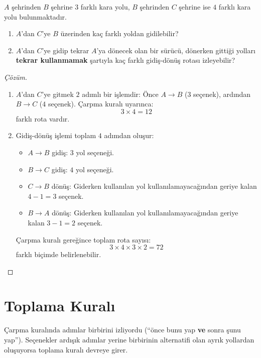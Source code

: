 \begin{example}
$A$ şehrinden $B$ şehrine $3$ farklı kara yolu, $B$ şehrinden $C$ şehrine ise $4$ farklı kara yolu bulunmaktadır.
\begin{enumerate}
  \item $A$'dan $C$'ye $B$ üzerinden kaç farklı yoldan gidilebilir?
  \item $A$'dan $C$'ye gidip tekrar $A$'ya dönecek olan bir sürücü, dönerken gittiği yolları \textbf{tekrar kullanmamak} şartıyla kaç farklı gidiş-dönüş rotası izleyebilir?
\end{enumerate}
\end{example}
\begin{proof}[Çözüm]
\begin{enumerate}
  \item $A$'dan $C$'ye gitmek $2$ adımlı bir işlemdir: Önce $A \to B$ ($3$ seçenek), ardından $B \to C$ ($4$ seçenek). Çarpma kuralı uyarınca:
  \[ 3 \times 4 = 12 \]
  farklı rota vardır.

  \item Gidiş-dönüş işlemi toplam $4$ adımdan oluşur:
  \begin{itemize}
    \item $A \to B$ gidiş: $3$ yol seçeneği.
    \item $B \to C$ gidiş: $4$ yol seçeneği.
    \item $C \to B$ dönüş: Giderken kullanılan yol kullanılamayacağından geriye kalan $4 - 1 = 3$ seçenek.
    \item $B \to A$ dönüş: Giderken kullanılan yol kullanılamayacağından geriye kalan $3 - 1 = 2$ seçenek.
  \end{itemize}
  Çarpma kuralı gereğince toplam rota sayısı:
  \[ 3 \times 4 \times 3 \times 2 = 72 \]
  farklı biçimde belirlenebilir.
\end{enumerate}
\end{proof}


\section{Toplama Kuralı}

Çarpma kuralında adımlar birbirini izliyordu (``önce bunu yap \textbf{ve} sonra şunu yap''). Seçenekler ardışık adımlar yerine birbirinin alternatifi olan ayrık yollardan oluşuyorsa toplama kuralı devreye girer.

